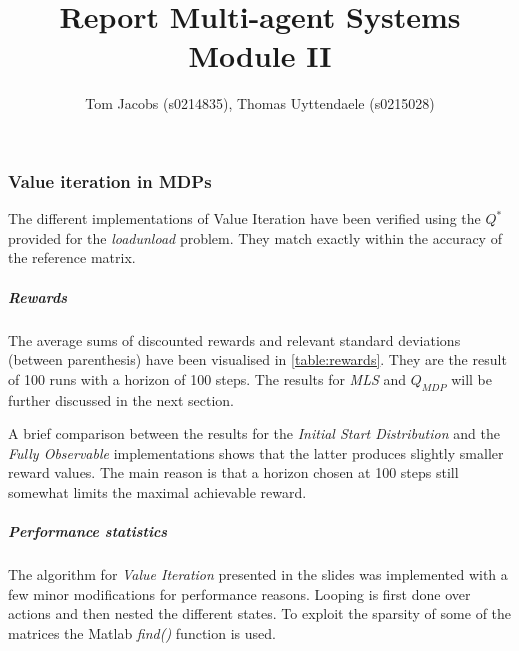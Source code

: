 \documentclass[10pt,a4paper]{article}
\title{Report Multi-agent Systems Module II}
\author{Tom Jacobs (s0214835), Thomas Uyttendaele (s0215028)}
\begin{document}
\maketitle


\part{}


\section{Value iteration in MDPs}

The different implementations of Value Iteration have been verified using the $Q^{*}$ provided for the \emph{loadunload} problem. They match exactly within the accuracy of the reference matrix.

\subsubsection*{Rewards}

The average sums of discounted rewards and relevant standard deviations (between parenthesis) have been visualised in \ref{table:rewards}. 
They are the result of 100 runs with a horizon of 100 steps.
The results for \emph{MLS} and \emph{$Q_{MDP}$} will be further discussed in the next section.

A brief comparison between the results for the \emph{Initial Start Distribution} and the \emph{Fully Observable} implementations shows that the latter produces slightly smaller reward values. 
The main reason is that a horizon chosen at 100 steps still somewhat limits the maximal achievable reward.

\subsubsection*{Performance statistics}

The algorithm for \emph{Value Iteration} presented in the slides was implemented with a few minor modifications for performance reasons. 
Looping is first done over actions and then nested the different states. To exploit the sparsity of some of the matrices the Matlab \emph{find()} function is used.
\end{document}
